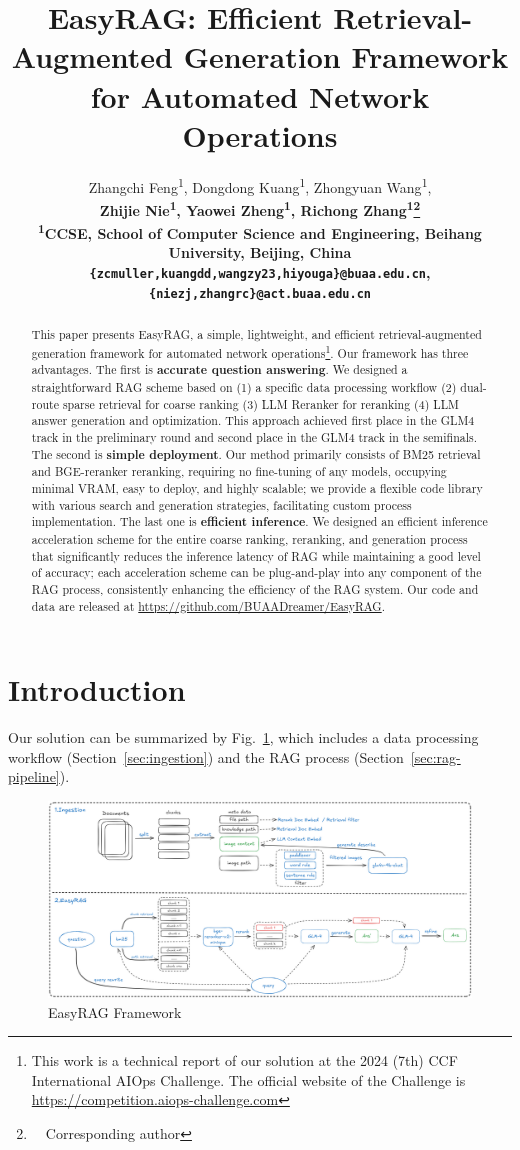 \documentclass[11pt]{article}
\title{EasyRAG: Efficient Retrieval-Augmented Generation Framework for Automated Network Operations}
\author{
    Zhangchi Feng\textsuperscript{\rm 1}, Dongdong Kuang\textsuperscript{\rm 1}, Zhongyuan Wang\textsuperscript{\rm 1},\\\bf {Zhijie Nie\textsuperscript{\rm 1}, Yaowei Zheng\textsuperscript{\rm 1}}, Richong Zhang\textsuperscript{\rm 1}\thanks{\ \ Corresponding author}\\
    \textsuperscript{\rm 1}CCSE, School of Computer Science and Engineering, Beihang University, Beijing, China\\
    \texttt{\{zcmuller,kuangdd,wangzy23,hiyouga\}@buaa.edu.cn}, \texttt{\{niezj,zhangrc\}@act.buaa.edu.cn}
}
\begin{document}
\maketitle
\begin{abstract}
This paper presents EasyRAG, a simple, lightweight, and efficient retrieval-augmented generation framework for automated network operations\footnote{This work is a technical report of our solution at the 2024 (7th) CCF International AIOps Challenge. The official website of the Challenge is \url{https://competition.aiops-challenge.com}}. Our framework has three advantages. The first is \textbf{accurate question answering}. We designed a straightforward RAG scheme based on (1) a specific data processing workflow (2) dual-route sparse retrieval for coarse ranking (3) LLM Reranker for reranking (4) LLM answer generation and optimization. This approach achieved first place in the GLM4 track in the preliminary round and second place in the GLM4 track in the semifinals. The second is \textbf{simple deployment}. Our method primarily consists of BM25 retrieval and BGE-reranker reranking, requiring no fine-tuning of any models, occupying minimal VRAM, easy to deploy, and highly scalable; we provide a flexible code library with various search and generation strategies, facilitating custom process implementation. The last one is \textbf{efficient inference}. We designed an efficient inference acceleration scheme for the entire coarse ranking, reranking, and generation process that significantly reduces the inference latency of RAG while maintaining a good level of accuracy; each acceleration scheme can be plug-and-play into any component of the RAG process, consistently enhancing the efficiency of the RAG system. Our code and data are released at \url{https://github.com/BUAADreamer/EasyRAG}.

\end{abstract}

\section{Introduction}
\label{sec:method}
Our solution can be summarized by Fig.~\ref{fig:overview}, which includes a data processing workflow (Section~\ref{sec:ingestion}) and the RAG process (Section~\ref{sec:rag-pipeline}).

\begin{figure}[htp!]
    \centering
    \includegraphics[width=\linewidth]{pics/overview.png}
    \caption{EasyRAG Framework}
    \label{fig:overview}
\end{figure}
\end{document}
